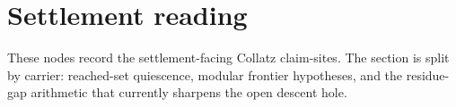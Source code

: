 \section{Settlement reading}

These nodes record the settlement-facing Collatz claim-sites.  The section is
split by carrier: reached-set quiescence, modular frontier hypotheses, and the
residue-gap arithmetic that currently sharpens the open descent hole.




